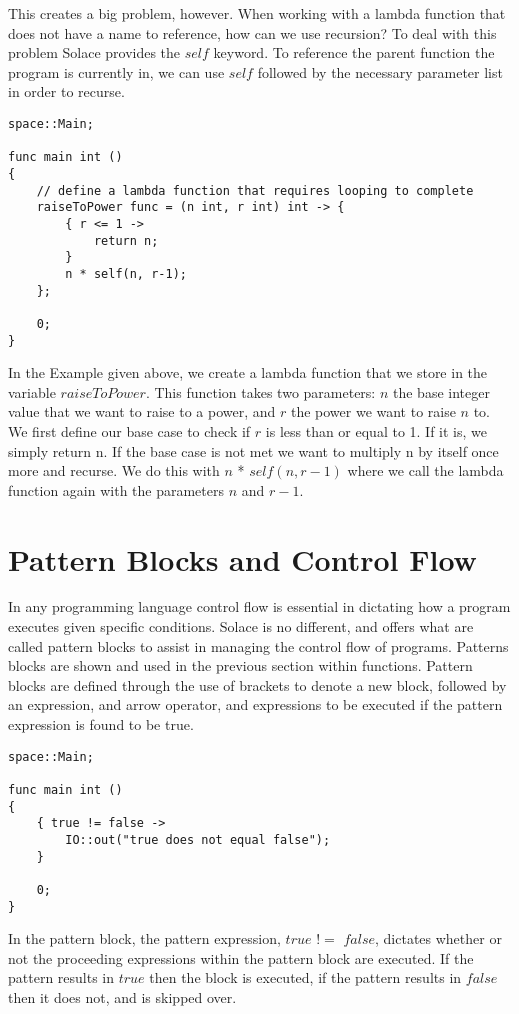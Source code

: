 \documentclass{article}
\begin{document}
This creates a big problem, however. When working with a lambda function that does not have a name to reference, how can we use recursion? To deal with this problem
Solace provides the $self$ keyword. To reference the parent function the program is currently in, we can use $self$ followed by the necessary parameter list in order
to recurse.

\begin{lstlisting}
space::Main;

func main int ()
{
	// define a lambda function that requires looping to complete
	raiseToPower func = (n int, r int) int -> {
		{ r <= 1 ->
			return n;
		}
		n * self(n, r-1);
	};

	0;
}
\end{lstlisting}

In the Example given above, we create a lambda function that we store in the variable $raiseToPower$. This function takes two parameters: $n$ the base integer value
that we want to raise to a power, and $r$ the power we want to raise $n$ to. We first define our base case to check if $r$ is less than or equal to 1. If it is,
we simply return n. If the base case is not met we want to multiply n by itself once more and recurse. We do this with $n$ * $self(n,r-1)$ where we call the
lambda function again with the parameters $n$ and $r-1$.


\section{Pattern Blocks and Control Flow}

In any programming language control flow is essential in dictating how a program executes given specific conditions. Solace is no different, and offers what are called
pattern blocks to assist in managing the control flow of programs. Patterns blocks are shown and used in the previous section within functions. Pattern blocks are defined
through the use of brackets to denote a new block, followed by an expression, and arrow operator, and expressions to be executed if the pattern expression is found to be true.

\begin{lstlisting}
space::Main;

func main int ()
{
	{ true != false ->
 		IO::out("true does not equal false");
	}
 
	0;
}
\end{lstlisting}

In the pattern block, the pattern expression, $true$ $!=$ $false$, dictates whether or not the proceeding expressions within the pattern block are executed. If the pattern
results in $true$ then the block is executed, if the pattern results in $false$ then it does not, and is skipped over.
\end{document}
